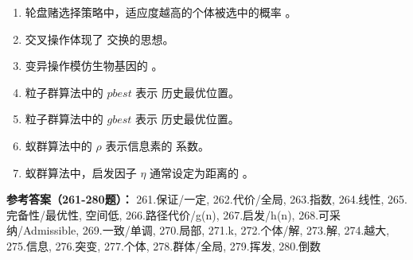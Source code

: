 \begin{enumerate}[resume,leftmargin=2em,itemsep=1pt]
\item 轮盘赌选择策略中，适应度越高的个体被选中的概率 \underline{\hspace{3em}}。
\item 交叉操作体现了 \underline{\hspace{3em}} 交换的思想。
\item 变异操作模仿生物基因的 \underline{\hspace{3em}}。
\item 粒子群算法中的 $pbest$ 表示 \underline{\hspace{3em}} 历史最优位置。
\item 粒子群算法中的 $gbest$ 表示 \underline{\hspace{3em}} 历史最优位置。
\item 蚁群算法中的 $\rho$ 表示信息素的 \underline{\hspace{3em}} 系数。
\item 蚁群算法中，启发因子 $\eta$ 通常设定为距离的 \underline{\hspace{3em}}。
\end{enumerate}

\textbf{参考答案（261-280题）：}
261.保证/一定, 262.代价/全局, 263.指数, 264.线性, 265.完备性/最优性, 空间低, 266.路径代价/g(n), 267.启发/h(n), 268.可采纳/Admissible, 269.一致/单调, 270.局部, 271.k, 272.个体/解, 273.解, 274.越大, 275.信息, 276.突变, 277.个体, 278.群体/全局, 279.挥发, 280.倒数

